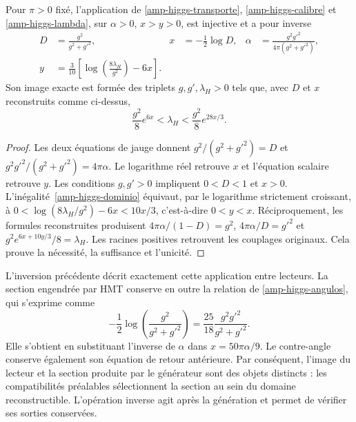 \begin{theorem}
\label{amp-higgs-inversa-teorema}
Pour $\pi>0$ fixé, l’application de
\eqref{amp-higgs-transporte}, \eqref{amp-higgs-calibre} et
\eqref{amp-higgs-lambda}, sur $\alpha>0$, $x>y>0$, est injective et a
pour inverse
\begin{equation}
 \begin{aligned}
 D&=\frac{g^2}{g^2+g'^2},&
 x&=-\frac12\log D,&
 \alpha&=\frac{g^2g'^2}{4\pi(g^2+g'^2)},\\
 y&=\frac3{10}\left[\log\!\left(\frac{8\lambda_H}{g^2}\right)-6x\right].
 \end{aligned}
 \label{amp-higgs-inversa}
\end{equation}
Son image exacte est formée des triplets $g,g',\lambda_H>0$ tels que,
avec $D$ et $x$ reconstruits comme ci-dessus,
\begin{equation}
 \frac{g^2}{8}e^{6x}<\lambda_H<\frac{g^2}{8}e^{28x/3}.
 \label{amp-higgs-dominio}
\end{equation}
\end{theorem}
\begin{proof}
Les deux équations de jauge donnent
$g^2/(g^2+g'^2)=D$ et
$g^2g'^2/(g^2+g'^2)=4\pi\alpha$. Le logarithme réel retrouve $x$ et
l’équation scalaire retrouve $y$. Les conditions $g,g'>0$ impliquent
$0<D<1$ et $x>0$. L’inégalité~\eqref{amp-higgs-dominio} équivaut,
par le logarithme strictement croissant, à
$0<\log(8\lambda_H/g^2)-6x<10x/3$, c’est-à-dire $0<y<x$.
Réciproquement, les formules reconstruites produisent
$4\pi\alpha/(1-D)=g^2$, $4\pi\alpha/D=g'^2$ et
$g^2e^{6x+10y/3}/8=\lambda_H$. Les racines positives retrouvent les
couplages originaux. Cela prouve la nécessité, la suffisance et l’unicité.
\end{proof}

L’inversion précédente décrit exactement cette application entre lecteurs.
La section engendrée par HMT conserve en outre la relation de
\eqref{amp-higgs-angulos}, qui s’exprime comme
\begin{equation}
 -\frac12\log\!\left(\frac{g^2}{g^2+g'^2}\right)
 =\frac{25}{18}\frac{g^2g'^2}{g^2+g'^2}.
 \label{amp-higgs-compatibilidad-alpha}
\end{equation}
Elle s’obtient en substituant l’inverse de $\alpha$ dans $x=50\pi\alpha/9$.
Le contre-angle conserve également son équation de retour antérieure.
Par conséquent, l’image du lecteur et la section produite par le générateur
sont des objets distincts : les compatibilités préalables sélectionnent la section
au sein du domaine reconstructible. L’opération inverse agit après
la génération et permet de vérifier ses sorties conservées.


